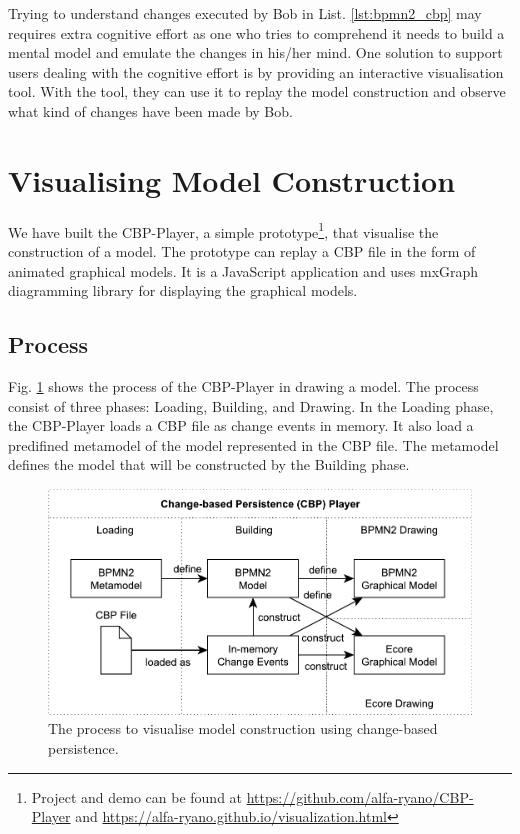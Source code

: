\documentclass[conference]{IEEEtran}
\begin{document}
Trying to understand changes executed by Bob in List. \ref{lst:bpmn2_cbp} may requires extra cognitive effort 
as one who tries to comprehend it needs to build a mental model and emulate the changes in his/her mind.
One solution to support users dealing with the cognitive effort is by providing an interactive visualisation tool.
With the tool, they can use it to replay the model construction and observe what kind of changes have been made by Bob.

\section{Visualising Model Construction}
\label{sec:visualising_model_construction}
We have built the CBP-Player, 
a simple prototype\footnote{Project and demo can be found at \url{https://github.com/alfa-ryano/CBP-Player} and \url{https://alfa-ryano.github.io/visualization.html}},
that visualise the construction of a model. The prototype can replay a CBP file in the form of animated graphical models.
It is a JavaScript application and uses mxGraph diagramming library \cite{mxgraph2019mxgraph} for displaying the graphical models. 

\subsection{Process}
\label{sec:process}
Fig. \ref{fig:process} shows the process of the CBP-Player in drawing a model. 
The process consist of three phases: Loading, Building, and Drawing.  
In the Loading phase, the CBP-Player loads a CBP file as change events in memory. 
It also load a predifined metamodel of the model represented in the CBP file. 
The metamodel defines the model that will be constructed by the Building phase.

\begin{figure}[h]
    \includegraphics[width=\linewidth]{process}
    \caption{The process to visualise model construction using change-based persistence.}
    \label{fig:process}
\end{figure}
\end{document}
